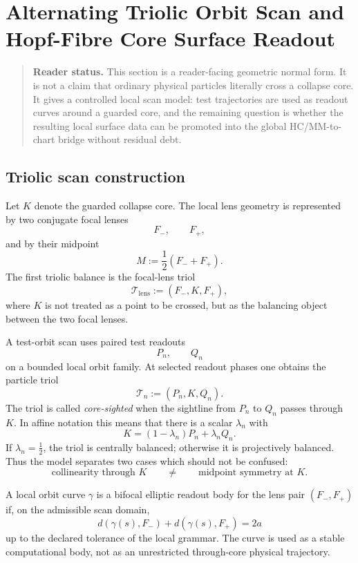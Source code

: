 \section{Alternating Triolic Orbit Scan and Hopf-Fibre Core Surface Readout}
\label{sec:alternating-triolic-orbit-scan}

\begin{quote}\small
\noindent\textbf{Reader status.}
This section is a reader-facing geometric normal form.  It is not a claim that ordinary physical particles literally cross a collapse core.  It gives a controlled local scan model: test trajectories are used as readout curves around a guarded core, and the remaining question is whether the resulting local surface data can be promoted into the global HC/MM-to-chart bridge without residual debt.
\end{quote}

\subsection{Triolic scan construction}
\label{subsec:triolic-scan-construction}

Let $K$ denote the guarded collapse core.  The local lens geometry is represented by two conjugate focal lenses
\[
F_- ,\qquad F_+,
\]
and by their midpoint
\[
M := \frac{1}{2}(F_-+F_+).
\]
The first triolic balance is the focal-lens triol
\[
\mathcal T_{\mathrm{lens}} := (F_-,K,F_+),
\]
where $K$ is not treated as a point to be crossed, but as the balancing object between the two focal lenses.

A test-orbit scan uses paired test readouts
\[
P_n,\qquad Q_n
\]
on a bounded local orbit family.  At selected readout phases one obtains the particle triol
\[
\mathcal T_n := (P_n,K,Q_n).
\]
The triol is called \emph{core-sighted} when the sightline from $P_n$ to $Q_n$ passes through $K$.  In affine notation this means that there is a scalar $\lambda_n$ with
\[
K=(1-\lambda_n)P_n+\lambda_n Q_n.
\]
If $\lambda_n=\tfrac12$, the triol is centrally balanced; otherwise it is projectively balanced.  Thus the model separates two cases which should not be confused:
\[
\text{collinearity through }K
\qquad\neq\qquad
\text{midpoint symmetry at }K.
\]

\begin{definition}
\label{def:bifocal-elliptic-readout-body}
A local orbit curve $\gamma$ is a bifocal elliptic readout body for the lens pair $(F_-,F_+)$ if, on the admissible scan domain,
\[
 d(\gamma(s),F_-)+d(\gamma(s),F_+) = 2a
\]
up to the declared tolerance of the local grammar.  The curve is used as a stable computational body, not as an unrestricted through-core physical trajectory.
\end{definition}

